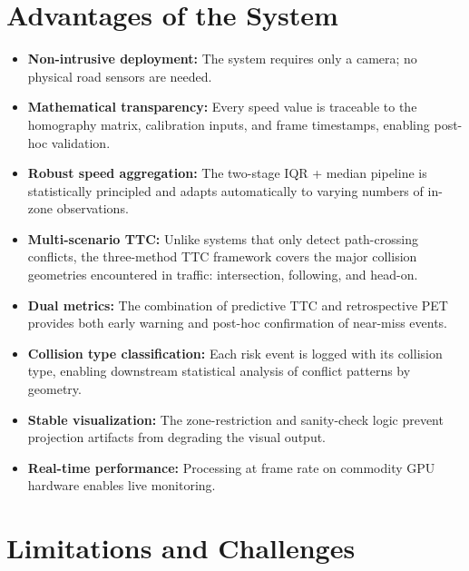 \documentclass[12pt]{report}
\begin{document}
\section{Advantages of the System}

\begin{itemize}
    \item \textbf{Non-intrusive deployment:} The system requires only a camera; no physical road sensors are needed.
    \item \textbf{Mathematical transparency:} Every speed value is traceable to the homography matrix, calibration inputs, and frame timestamps, enabling post-hoc validation.
    \item \textbf{Robust speed aggregation:} The two-stage IQR + median pipeline is statistically principled and adapts automatically to varying numbers of in-zone observations.
    \item \textbf{Multi-scenario TTC:} Unlike systems that only detect path-crossing conflicts, the three-method TTC framework covers the major collision geometries encountered in traffic: intersection, following, and head-on.
    \item \textbf{Dual metrics:} The combination of predictive TTC and retrospective PET provides both early warning and post-hoc confirmation of near-miss events.
    \item \textbf{Collision type classification:} Each risk event is logged with its collision type, enabling downstream statistical analysis of conflict patterns by geometry.
    \item \textbf{Stable visualization:} The zone-restriction and sanity-check logic prevent projection artifacts from degrading the visual output.
    \item \textbf{Real-time performance:} Processing at frame rate on commodity GPU hardware enables live monitoring.
\end{itemize}

\section{Limitations and Challenges}
\end{document}
